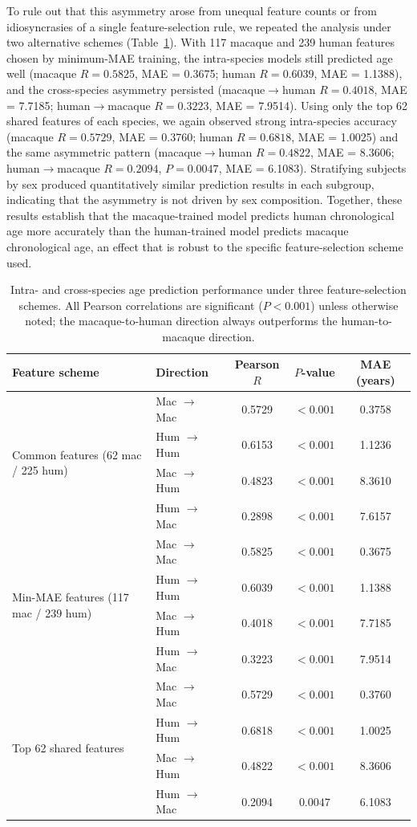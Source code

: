 \documentclass[11pt]{article}
\begin{document}
To rule out that this asymmetry arose from unequal feature counts or from idiosyncrasies of a single feature-selection rule, we repeated the analysis under two alternative schemes (Table~\ref{tab:prediction}). With 117 macaque and 239 human features chosen by minimum-MAE training, the intra-species models still predicted age well (macaque $R = 0.5825$, MAE = 0.3675; human $R = 0.6039$, MAE = 1.1388), and the cross-species asymmetry persisted (macaque$\to$human $R = 0.4018$, MAE = 7.7185; human$\to$macaque $R = 0.3223$, MAE = 7.9514). Using only the top 62 shared features of each species, we again observed strong intra-species accuracy (macaque $R = 0.5729$, MAE = 0.3760; human $R = 0.6818$, MAE = 1.0025) and the same asymmetric pattern (macaque$\to$human $R = 0.4822$, MAE = 8.3606; human$\to$macaque $R = 0.2094$, $P = 0.0047$, MAE = 6.1083). Stratifying subjects by sex produced quantitatively similar prediction results in each subgroup, indicating that the asymmetry is not driven by sex composition. Together, these results establish that the macaque-trained model predicts human chronological age more accurately than the human-trained model predicts macaque chronological age, an effect that is robust to the specific feature-selection scheme used.

\begin{table}[htbp]
\centering
\caption{Intra- and cross-species age prediction performance under three feature-selection schemes. All Pearson correlations are significant ($P < 0.001$) unless otherwise noted; the macaque-to-human direction always outperforms the human-to-macaque direction.}
\label{tab:prediction}
\small
\begin{tabular}{llccc}
\toprule
Feature scheme & Direction & Pearson $R$ & $P$-value & MAE (years) \\
\midrule
\multirow{4}{*}{Common features (62 mac / 225 hum)} & Mac $\rightarrow$ Mac & 0.5729 & $<0.001$ & 0.3758 \\
 & Hum $\rightarrow$ Hum & 0.6153 & $<0.001$ & 1.1236 \\
 & Mac $\rightarrow$ Hum & 0.4823 & $<0.001$ & 8.3610 \\
 & Hum $\rightarrow$ Mac & 0.2898 & $<0.001$ & 7.6157 \\
\midrule
\multirow{4}{*}{Min-MAE features (117 mac / 239 hum)} & Mac $\rightarrow$ Mac & 0.5825 & $<0.001$ & 0.3675 \\
 & Hum $\rightarrow$ Hum & 0.6039 & $<0.001$ & 1.1388 \\
 & Mac $\rightarrow$ Hum & 0.4018 & $<0.001$ & 7.7185 \\
 & Hum $\rightarrow$ Mac & 0.3223 & $<0.001$ & 7.9514 \\
\midrule
\multirow{4}{*}{Top 62 shared features} & Mac $\rightarrow$ Mac & 0.5729 & $<0.001$ & 0.3760 \\
 & Hum $\rightarrow$ Hum & 0.6818 & $<0.001$ & 1.0025 \\
 & Mac $\rightarrow$ Hum & 0.4822 & $<0.001$ & 8.3606 \\
 & Hum $\rightarrow$ Mac & 0.2094 & $0.0047$ & 6.1083 \\
\bottomrule
\end{tabular}
\end{table}
\end{document}
